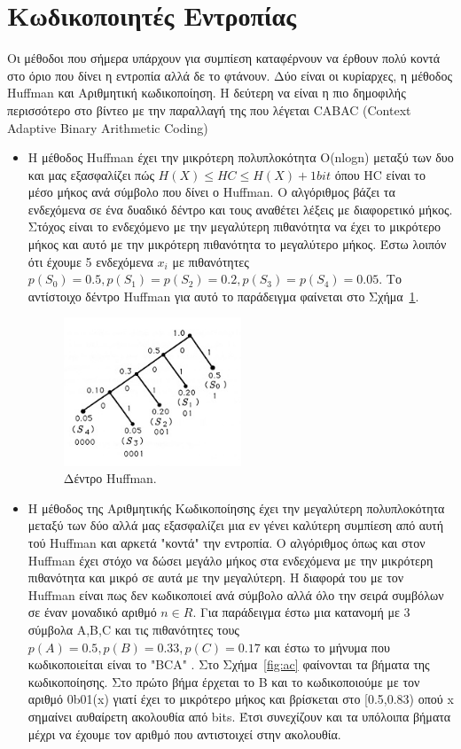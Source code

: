 \section{Κωδικοποιητές Εντροπίας}
\label{section:sect33}

\indent Οι μέθοδοι που σήμερα υπάρχουν για συμπίεση καταφέρνουν να έρθουν πολύ κοντά στο όριο που δίνει η εντροπία αλλά δε το φτάνουν. Δύο είναι οι κυρίαρχες, η μέθοδος Huffman και Αριθμητική κωδικοποίηση. Η δεύτερη να είναι η πιο δημοφιλής περισσότερο στο βίντεο με την παραλλαγή της που λέγεται CABAC (Context Adaptive Binary Arithmetic Coding)
\begin{itemize}
  \item Η μέθοδος Huffman έχει την μικρότερη πολυπλοκότητα O(nlogn) μεταξύ των δυο και μας εξασφαλίζει πώς $ H(X) \leq HC \leq H(X)+1bit  $ όπου HC είναι το μέσο μήκος ανά σύμβολο που δίνει ο Huffman. Ο αλγόριθμος βάζει τα ενδεχόμενα σε ένα δυαδικό δέντρο και τους αναθέτει λέξεις με διαφορετικό μήκος. Στόχος είναι το ενδεχόμενο με την μεγαλύτερη πιθανότητα να έχει το μικρότερο μήκος και αυτό με την μικρότερη πιθανότητα το μεγαλύτερο μήκος. Έστω λοιπόν ότι έχουμε 5 ενδεχόμενα $x_i$ με πιθανότητες $p(S_0) = 0.5, p(S_1)=p(S_2)=0.2, p(S_3)=p(S_4)=0.05$. Το αντίστοιχο δέντρο Huffman για αυτό το παράδειγμα φαίνεται στο Σχήμα~\ref{fig:huffman}.
      \begin{figure}[h!]
          \centering
          \includegraphics[width=0.5\textwidth]{chapter3/huffman.jpg}
          \caption{Δέντρο Huffman. \cite{misc:huffman}}
          \label{fig:huffman}
      \end{figure}

\newpage
  \item Η μέθοδος της Αριθμητικής Κωδικοποίησης έχει την μεγαλύτερη πολυπλοκότητα μεταξύ των δύο αλλά μας εξασφαλίζει μια εν γένει καλύτερη συμπίεση από αυτή τού Huffman και αρκετά "κοντά" την εντροπία. Ο αλγόριθμος όπως και στον Huffman έχει στόχο να δώσει μεγάλο μήκος στα ενδεχόμενα με την μικρότερη πιθανότητα και μικρό σε αυτά με την μεγαλύτερη. Η διαφορά του με τον Ηuffman είναι πως δεν κωδικοποιεί ανά σύμβολο αλλά όλο την σειρά συμβόλων σε έναν μοναδικό αριθμό $n \in R$. Για παράδειγμα έστω μια κατανομή με 3 σύμβολα A,B,C και τις πιθανότητες τους $ p(A) = 0.5, p(B) = 0.33, p(C) = 0.17 $ και έστω το μήνυμα που κωδικοποιείται είναι το "BCA" . Στο Σχήμα~\ref{fig:ac} φαίνονται τα βήματα της κωδικοποίησης. Στο πρώτο βήμα έρχεται το B και το κωδικοποιούμε με τον αριθμό 0b01(x) γιατί έχει το μικρότερο μήκος και βρίσκεται στο [0.5,0.83) οπού x σημαίνει αυθαίρετη ακολουθία από bits. Έτσι συνεχίζουν και τα υπόλοιπα βήματα μέχρι να έχουμε τον αριθμό που αντιστοιχεί στην ακολουθία.


\end{itemize}
